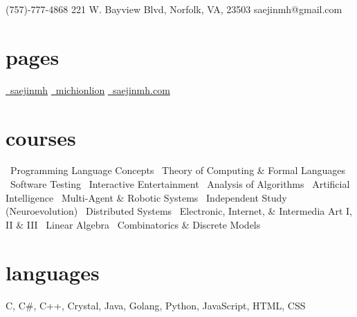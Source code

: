 \documentclass[]{friggeri-cv}
\begin{document}
       {\faMobilePhone\hspace{1mm}(757)-777-4868 \hspace{1cm} 221 W. Bayview Blvd, Norfolk, VA, 23503 \hspace{1.5cm} \faEnvelope\hspace{1.5mm}saejinmh@gmail.com}

\begin{aside}
  \section{pages}\vspace{0.05cm}
    \href{https://www.linkedin.com/in/saejinmh}{\faLinkedin\ saejinmh}\vspace{0.03cm}
    \href{https://github.com/Michionlion}{\faGithub\ michionlion}\vspace{0.03cm}
    \href{https://michionlion.github.io}{\faGlobe\ saejinmh.com}\vspace{0.03cm}
  \section{courses}\vspace{0.05cm}
  \bullet\ Programming Language Concepts\vspace{0.1cm}
  \bullet\ Theory of Computing \& Formal Languages\vspace{0.1cm}
  \bullet\ Software Testing\vspace{0.1cm}
  \bullet\ Interactive Entertainment\vspace{0.1cm}
  \bullet\ Analysis of Algorithms\vspace{0.1cm}
  \bullet\ Artificial Intelligence\vspace{0.1cm}
  \bullet\ Multi-Agent \& Robotic Systems\vspace{0.1cm}
  \bullet\ Independent Study (Neuroevolution)\vspace{0.1cm}
  \bullet\ Distributed Systems\vspace{0.1cm}
  \bullet\ Electronic, Internet, \& Intermedia Art I, II \& III\vspace{0.1cm}
  \bullet\ Linear Algebra\vspace{0.1cm}
  \bullet\ Combinatorics \& Discrete Models\vspace{0.1cm}
  \section{languages}\vspace{0.05cm}
    C, C\#, C++, Crystal, Java, Golang, Python, JavaScript, HTML, CSS\vspace{0.1cm}

\end{aside}
\end{document}
